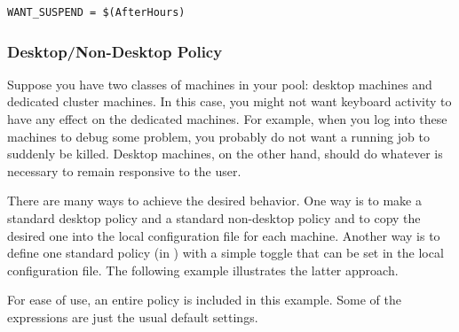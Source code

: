 \begin{verbatim}
WANT_SUSPEND = $(AfterHours)
\end{verbatim}

\subsubsection{\label{sec:Desktop/Non-Desktop Policy}
Desktop/Non-Desktop Policy}

Suppose you have two classes of machines in your pool: desktop
machines and dedicated cluster machines.  In this case, you might not
want keyboard activity to have any effect on the dedicated machines.
For example, when you log into these machines to debug some problem,
you probably do not want a running job to suddenly be killed.  Desktop
machines, on the other hand, should do whatever is necessary to remain
responsive to the user.

There are many ways to achieve the desired behavior.  One way is to
make a standard desktop policy and a standard non-desktop policy and
to copy the desired one into the local configuration file for each
machine.  Another way is to define one standard policy (in
) with a simple toggle that can be set in the local
configuration file.  The following example illustrates the latter
approach.

For ease of use, an entire policy is included in this example.  Some of the
expressions are just the usual default settings.

